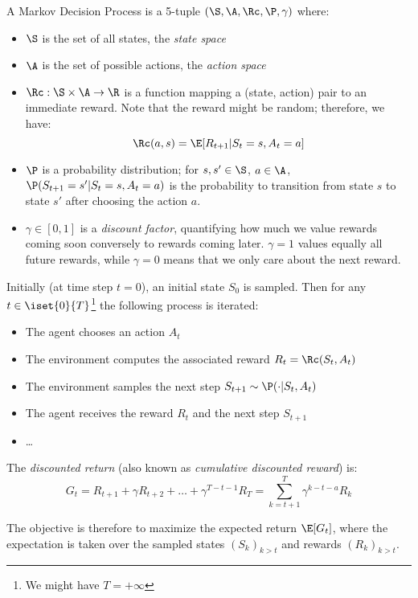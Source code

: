 \begin{definition}
    A Markov Decision Process is a 5-tuple $(\S, \A, \Rc, \P, \gamma)$ where:
    \begin{itemize}
        \item $\S$ is the set of all states, the \emph{state space}
        \item $\A$ is the set of possible actions, the \emph{action space}
        \item $\Rc:\S\times\A\to\R$ is a function mapping a (state, action) pair to an immediate reward. Note that the reward might be random; therefore, we have:
        \begin{equation*}
            \Rc(a,s) = \E[R_{t+1}|S_t=s,A_t=a]
        \end{equation*}
        \item $\P$ is a probability distribution; for $s,s'\in\S$, $a\in\A$, $\P(S_{t+1}=s'|S_t=s,A_t=a)$ is the probability to transition from state $s$ to state $s'$ after choosing the action $a$.
        \item $\gamma\in[0,1]$ is a \emph{discount factor}, quantifying how much we value rewards coming soon conversely to rewards coming later. $\gamma=1$ values equally all future rewards, while $\gamma=0$ means that we only care about the next reward.
    \end{itemize}

    Initially (at time step $t=0$), an initial state $S_0$ is sampled. Then for any $t\in\iset{0}{T}$\footnote{We might have $T=+\infty$} the following process is iterated:
    \begin{itemize}
        \item The agent chooses an action $A_t$
        \item The environment computes the associated reward $R_t=\Rc(S_t,A_t)$
        \item The environment samples the next step $S_{t+1}\sim\P(\cdot|S_t,A_t)$
        \item The agent receives the reward $R_t$ and the next step $S_{t+1}$
        \item \dots
    \end{itemize}
\end{definition}

\begin{definition}
    The \emph{discounted return} (also known as \emph{cumulative discounted reward}) is:
    \begin{equation*}
        G_t=R_{t+1}+\gamma R_{t+2}+\dots+\gamma^{T-t-1}R_T = \sum_{k=t+1}^T\gamma^{k-t-a}R_k
    \end{equation*}
\end{definition}
The objective is therefore to maximize the expected return $\E[G_t]$, where the expectation is taken over the sampled states $(S_k)_{k>t}$ and rewards $(R_k)_{k>t}$.


